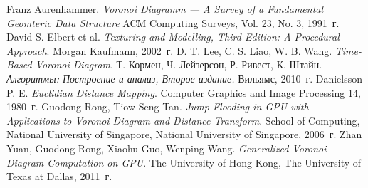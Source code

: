 \documentclass[12pt]{article}
\begin{document}
\begin{thebibliography}{10}
 Franz Aurenhammer. \textit{Voronoi Diagramm --- A Survey of a Fundamental Geomteric Data Structure} 
ACM Computing Surveys, Vol. 23, No. 3, 1991~г.
 David S. Elbert et al. \textit{Texturing and Modelling, Third Edition: A Procedural Approach}. 
Morgan Kaufmann, 2002~г.
 D. T. Lee, C. S. Liao, W. B. Wang. \textit{Time-Based Voronoi Diagram}.
 Т. Кормен, Ч. Лейзерсон, Р. Ривест, К. Штайн. \textit{Алгоритмы:
Построение и анализ, Второе издание.} Вильямс, 2010~г.
 Danielsson P. E. \textit{Euclidian Distance Mapping}. Computer Graphics and Image Processing 14, 1980~г.
 Guodong Rong, Tiow-Seng Tan. \textit{Jump Flooding in GPU with Applications to Voronoi Diagram and Distance Transform}. School of Computing, 
National University of Singapore, National University of Singapore, 2006~г. 
 Zhan Yuan, Guodong Rong, Xiaohu Guo, Wenping Wang. \textit{Generalized Voronoi Diagram Computation on GPU}. The University of Hong Kong, The University of Texas at Dallas, 2011~г.
\end{thebibliography}
\end{document}
